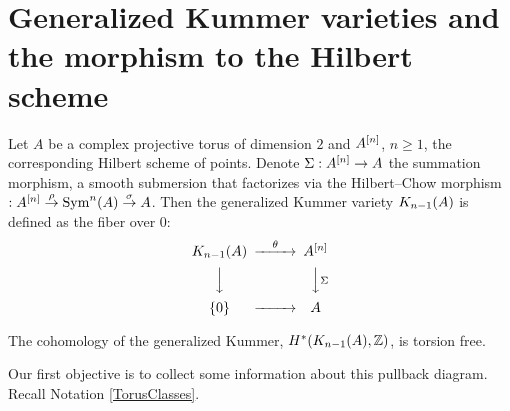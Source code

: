 \section{Generalized Kummer varieties and the morphism to the Hilbert scheme}
\label{Section_GeneralKummer}
\begin{definition}
Let $A$ be a complex projective torus of dimension $2$ and $A\hilb{n}$, $n\geq 1$, the corresponding Hilbert scheme of points. Denote $\Sigma : A\hilb{n} \rightarrow A$ the summation morphism, a smooth submersion that factorizes via the Hilbert--Chow morphism $: A\hilb{n}\stackrel{\rho}{\rightarrow}\Sym^n(A)\stackrel{\sigma}{\rightarrow} A$. Then the generalized Kummer variety $\kum{A}{n-1}$ is defined as the fiber over $0$:
\begin{equation}\label{square}
\begin{CD}
\kum{A}{n-1} @>\theta >> A\hilb{n}\\
@VVV @VV\Sigma V\\
\{0\} @> >> A
\end{CD}
\end{equation}
\end{definition}
\begin{theorem} \cite[Theorem 2]{Spanier}\label{torsion}
The cohomology of the generalized Kummer, $H^*(\kum{A}{n-1},\Z)$, is torsion free. 
\end{theorem}
Our first objective is to collect some information about this pullback diagram. 
Recall Notation \ref{TorusClasses}.


